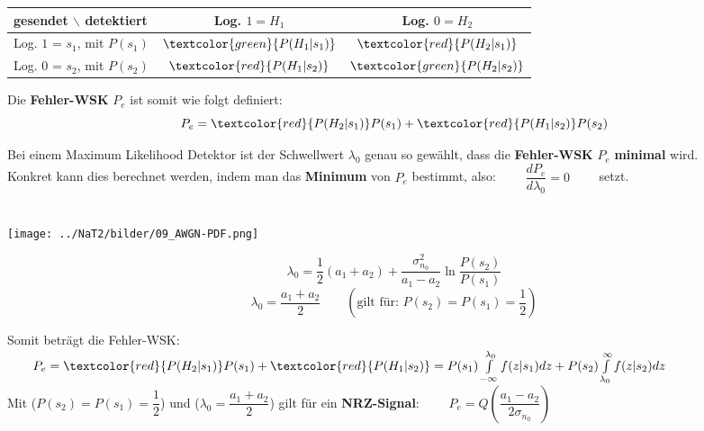 \begin{minipage}[c]{10cm}
	\begin{center}
	 	\begin{tabular}{|l|c|c|}
			\hline
				gesendet $\backslash$ detektiert & Log. $1 = H_1$ & Log. $0 = H_2$ \\
			\hline
				Log. $1$ = $s_1$, mit $P(s_1)$ & $\textcolor{green}{P(H_1 | s_1)}$ 
												&  $\textcolor{red}{P(H_2 | s_1)}$\\
			\hline
				Log. $0$ = $s_2$, mit $P(s_2)$ & $\textcolor{red}{P(H_1 | s_2)}$ 
												& $\textcolor{green}{P(H_2 | s_2)}$ \\
			\hline
		\end{tabular}  
  	\end{center}
\end{minipage}
\begin{minipage}[c]{8cm}
	Die \textbf{Fehler-WSK} $P_e$ ist somit wie folgt definiert:
	$$ P_e = \textcolor{red}{P(H_2 | s_1)} P(s_1) + \textcolor{red}{P(H_1 | s_2)}
	P(s_2)$$
\end{minipage} 

Bei einem Maximum Likelihood Detektor ist der Schwellwert $\lambda_0$ genau so gewählt, dass die
\textbf{Fehler-WSK }$P_e$ \textbf{minimal} wird. \\
Konkret kann dies berechnet werden, indem man das \textbf{Minimum} von $P_e$ bestimmt, also: $\qquad
\dfrac{d P_e}{d \lambda_0} = 0 \qquad$ setzt. \\ \\

\begin{minipage}[c]{9.5cm}
 	\texttt{[image: ../NaT2/bilder/09\_AWGN-PDF.png]}
\end{minipage}
\begin{minipage}[c]{7cm}
	 $$ \lambda_0 = \dfrac{1}{2} (a_1 + a_2) + \dfrac{\sigma_{n_0}^2}{a_1 - a_2}
 \ln\dfrac{P(s_2)}{P(s_1)} $$ 
 	$$ \lambda_0 = \dfrac{a_1 + a_2}{2} \qquad (\text{gilt für: } P(s_2) = P(s_1) = \dfrac{1}{2})
 	$$
\end{minipage} 

Somit beträgt die Fehler-WSK: $ \qquad P_e = \textcolor{red}{P(H_2 | s_1)} P(s_1) + \textcolor{red}{P(H_1 | s_2)} = 
 P(s_1) \int\limits_{-\infty}^{\lambda_0} f(z|s_1) dz + P(s_2) \int\limits_{\lambda_0}^{\infty}
 f(z|s_2) dz$ \\
Mit ($P(s_2) = P(s_1) = \dfrac{1}{2}$) und ($\lambda_0 = \dfrac{a_1 + a_2}{2}$) gilt für ein
\textbf{NRZ-Signal}: $ \qquad P_e = Q \left(\dfrac{a_1 - a_2}{2 \sigma_{n_0}}\right) $



